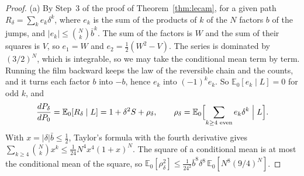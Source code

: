 \documentclass[11pt]{article}
\theoremstyle{definition}
\theoremstyle{remark}
\newcommand{\E}{\mathbb E}
\begin{document}
\begin{proof}
(a) By Step~3 of the proof of Theorem~\ref{thm:lecam}, for a given path
$R_\delta=\sum_ke_k\delta^k$, where $e_k$ is the sum of the products of $k$ of
the $N$ factors $b$ of the jumps, and $\lvert e_k\rvert\le\binom Nk\bar b^k$.
The sum of the factors is $W$ and the sum of their squares is $V$, so $e_1=W$
and $e_2=\frac12(W^2-V)$. The series is dominated by $(3/2)^N$, which is
integrable, so we may take the conditional mean term by term. Running the
film backward keeps the law of the reversible chain and the counts, and it
turns each factor $b$ into $-b$, hence $e_k$ into $(-1)^ke_k$. So
$\E_0[e_k\mid L]=0$ for odd $k$, and
\[
 \frac{dP_\delta}{dP_0}=\E_0[R_\delta\mid L]=1+\delta^2S+\rho_\delta,\qquad
 \rho_\delta=\E_0\Bigl[\sum_{k\ge4\text{ even}}e_k\delta^k\Bigm|L\Bigr].
\]
With $x=\lvert\delta\rvert\bar b\le\frac12$, Taylor's formula with the fourth
derivative gives
$\sum_{k\ge4}\binom Nkx^k\le\frac1{24}N^4x^4(1+x)^N$. The square of a
conditional mean is at most the conditional mean of the square, so
$\E_0[\rho_\delta^2]\le\frac1{24^2}\bar b^8\delta^8\,\E_0[N^8(9/4)^N]$.


\end{proof}
\end{document}
